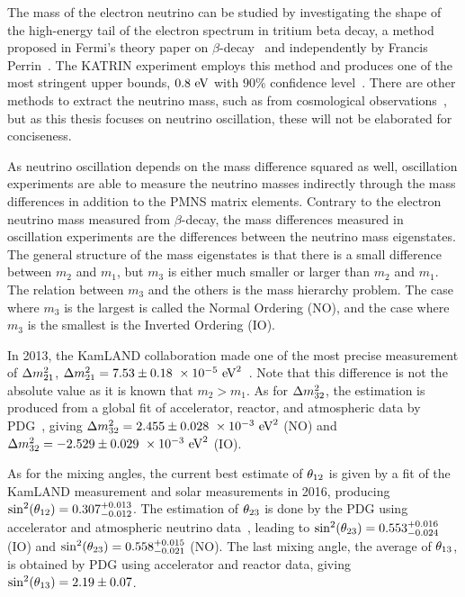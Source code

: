 The mass of the electron neutrino can be studied by investigating the shape of the high-energy tail of the electron spectrum in tritium beta decay, a method proposed in Fermi's theory paper on $\beta$-decay~\cite{Fermi:1934hr} and independently by Francis Perrin~\cite{Perrin1933}.
The KATRIN experiment employs this method and produces one of the most stringent upper bounds, $0.8~\textrm{eV}$ with $90\%$ confidence level~\cite{KATRIN:2021uub}.
There are other methods to extract the neutrino mass, such as from cosmological observations~\cite{Brieden:2022lsd}, but as this thesis focuses on neutrino oscillation, these will not be elaborated for conciseness.

As neutrino oscillation depends on the mass difference squared as well, oscillation experiments are able to measure the neutrino masses indirectly through the mass differences in addition to the PMNS matrix elements.
Contrary to the electron neutrino mass measured from $\beta$-decay, the mass differences measured in oscillation experiments are the differences between the neutrino mass eigenstates.
The general structure of the mass eigenstates is that there is a small difference between $m_2$ and $m_1$, but $m_3$ is either much smaller or larger than $m_2$ and $m_1$.
The relation between $m_3$ and the others is the mass hierarchy problem.
The case where $m_3$ is the largest is called the Normal Ordering (NO), and the case where $m_3$ is the smallest is the Inverted Ordering (IO).

In 2013, the KamLAND collaboration made one of the most precise measurement of $\Delta m^2_{21}$, $\Delta m^2_{21}=7.53\pm0.18~\times 10^{-5}~\textrm{eV}^2$~\cite{KamLAND:2013rgu}.
Note that this difference is not the absolute value as it is known that $m_2>m_1$.
As for $\Delta m^2_{32}$, the estimation is produced from a global fit of accelerator, reactor, and atmospheric data by PDG~\cite{ParticleDataGroup:2024cfk}, giving $\Delta m^2_{32}=2.455\pm0.028~\times 10^{-3}~\textrm{eV}^2$ (NO) and $\Delta m^2_{32}=-2.529\pm0.029~\times 10^{-3}~\textrm{eV}^2$ (IO).

As for the mixing angles, the current best estimate of $\theta_{12}$ is given by a fit of the KamLAND measurement and solar measurements in 2016, producing $\sin^2(\theta_{12})=0.307^{+0.013}_{-0.012}$.
The estimation of $\theta_{23}$ is done by the PDG using accelerator and atmospheric neutrino data~\cite{ParticleDataGroup:2024cfk}, leading to $\sin^2(\theta_{23})=0.553^{+0.016}_{-0.024}$ (IO) and $\sin^2(\theta_{23})=0.558^{+0.015}_{-0.021}$ (NO).
The last mixing angle, the average of $\theta_{13}$, is obtained by PDG using accelerator and reactor data, giving $\sin^2(\theta_{13})=2.19\pm0.07$.

